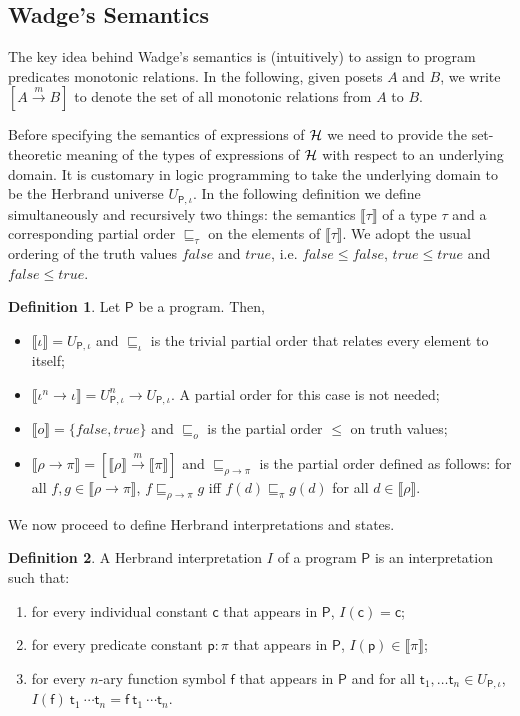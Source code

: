 \documentclass[submission,copyright]{eptcs}
\theoremstyle{definition}
\newtheorem{definition}{Definition}
\newcommand{\mo}[1]{\llbracket#1\rrbracket}
\newcommand{\aleq}[1][]{\sqsubseteq_{#1}}
\begin{document}
\subsection{Wadge's Semantics}
\label{sec:hosem}
The key idea behind Wadge's semantics is (intuitively) to assign to program
predicates monotonic relations. In the following, given posets $A$ and $B$,
we write $[A \stackrel{m}{\rightarrow} B]$ to denote the set of all monotonic
relations from $A$ to $B$.

Before specifying the semantics of expressions of ${\cal H}$ we need to
provide the set-theoretic meaning of the types of expressions of
${\cal H}$ with respect to an underlying domain. It is customary in
logic programming to take the underlying domain to be the Herbrand
universe $U_{\mathsf{P},\iota}$. In the following definition we define
simultaneously and recursively two things: the semantics $\mo{\tau}$
of a type $\tau$ and a corresponding partial order $\aleq[\tau]$
on the elements of $\mo{\tau}$. We adopt the usual ordering of the truth values
$\mathit{false}$ and $\mathit{true}$, i.e. $\mathit{false} \leq \mathit{false}$,
$\mathit{true}\leq \mathit{true}$ and $\mathit{false} \leq \mathit{true}$.
\begin{definition}
Let $\mathsf{P}$ be a program. Then,
\begin{itemize}
  \item $\mo{\iota} = U_{\mathsf{P},\iota}$ and $\aleq[\iota]$ is the trivial partial order
        that relates every element to itself;
  \item $\mo{\iota^n\rightarrow \iota} =  U_{\mathsf{P},\iota}^n \rightarrow U_{\mathsf{P},\iota}$. A partial order for this case is not needed;
  \item $\mo{o} = \{ \mathit{false}, \mathit{true} \}$ and $\aleq[o]$ is the partial order $\leq$ on truth values;
\item $\mo{\rho \rightarrow \pi} = [ \mo{\rho} \stackrel{m}{\rightarrow}  \mo{\pi} ]$ and $\aleq[\rho \rightarrow \pi]$
  is the partial order defined as follows: for all $f, g \in \mo{\rho \rightarrow \pi}$,
  $f \aleq[\rho \rightarrow \pi] g$ iff $f(d) \aleq[\pi] g(d)$ for all $d \in \mo{\rho}$.
\end{itemize}
\end{definition}
We now proceed to define Herbrand interpretations and states.
\begin{definition}
A Herbrand interpretation $I$ of a program $\mathsf{P}$ is an interpretation such that:
\begin{enumerate}
  \item for every individual constant $\mathsf{c}$ that appears in $\mathsf{P}$, $I(\mathsf{c}) = \mathsf{c}$;
  \item for every predicate constant $\mathsf{p} : \pi$ that appears in $\mathsf{P}$, $I(\mathsf{p}) \in \mo{\pi}$;
  \item for every $n$-ary function symbol $\mathsf{f}$ that appears in $\mathsf{P}$ and for all
  $\mathsf{t}_1, \ldots \mathsf{t}_n \in U_{\mathsf{P}, \iota}$, $I(\mathsf{f})\ \mathsf{t}_1\ \cdots \mathsf{t}_n = \mathsf{f}\ \mathsf{t}_1\ \cdots\mathsf{t}_n$.
\end{enumerate}
\end{definition}
\end{document}
